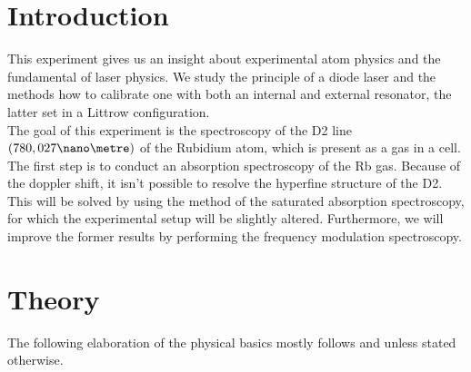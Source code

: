 
\section{Introduction}
This experiment gives us an insight about experimental atom physics and the fundamental of laser physics. We study the principle of a diode laser and the methods how to calibrate one with both an internal and external resonator, the latter set in a Littrow configuration.\\
The goal of this experiment is the spectroscopy of the D2 line $(780,027 \nano\metre)$ of the Rubidium atom, which is present as a gas in a cell.\\
The first step is to conduct an absorption spectroscopy of the Rb gas. Because of the doppler shift, it isn't possible to resolve the hyperfine structure of the D2. This will be solved by using the method of the saturated absorption spectroscopy, for which the experimental setup will be slightly altered. Furthermore, we will improve the former results by performing the frequency modulation spectroscopy.

\newpage
\section{Theory}
The following elaboration of the physical basics mostly follows \cite{lit:AK_manual2012} and \cite{lit:SAS} unless stated otherwise.
